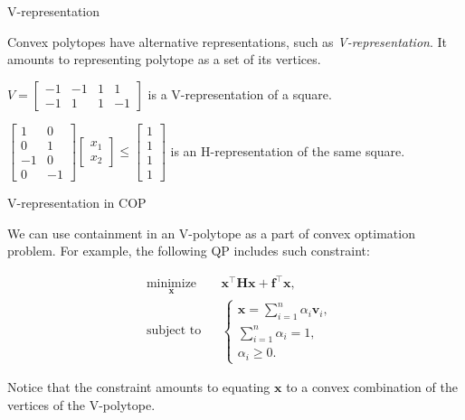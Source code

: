 \documentclass{beamer}
\begin{document}
\begin{frame}{V-representation}
\begin{flushleft}

Convex polytopes have alternative representations, such as \emph{V-representation}. It amounts to representing polytope as a set of its vertices.

\begin{example}
$V = \begin{bmatrix} -1 & -1 & 1 & 1 \\ -1 & 1 & 1 & -1 \end{bmatrix}$ is a V-representation of a square.
\end{example}

\begin{example}
$\begin{bmatrix} 1 & 0 \\ 0 & 1 \\ -1 & 0 \\ 0 & -1 \end{bmatrix}
\begin{bmatrix} x_1 \\ x_2 \end{bmatrix} \leq
\begin{bmatrix} 1 \\ 1 \\ 1 \\ 1 \end{bmatrix}$
is an H-representation of the same square.
\end{example}
 
\end{flushleft}
\end{frame}


\begin{frame}{V-representation in COP}
	\begin{flushleft}
		
		We can use containment in an V-polytope as a part of convex optimation problem. For example, the following QP includes such constraint:
		
		\begin{equation}
			\begin{aligned}
				& \underset{\mathbf{x}}{\text{minimize}}
				& & \mathbf{x}^\top \mathbf{H} \mathbf{x} + \mathbf{f}^\top\mathbf{x}, \\
				& \text{subject to}
				& & \begin{cases}
					\mathbf{x} = \sum\limits_{i=1}^{n} \alpha_i  \mathbf{v}_i, \\
					\sum\limits_{i=1}^{n} \alpha_i = 1, \\
					\alpha_i \geq 0.
				\end{cases}
			\end{aligned}
		\end{equation}
		
		Notice that the constraint amounts to equating $\mathbf{x}$ to a convex combination of the vertices of the V-polytope.
		
	\end{flushleft}
\end{frame}
\end{document}
